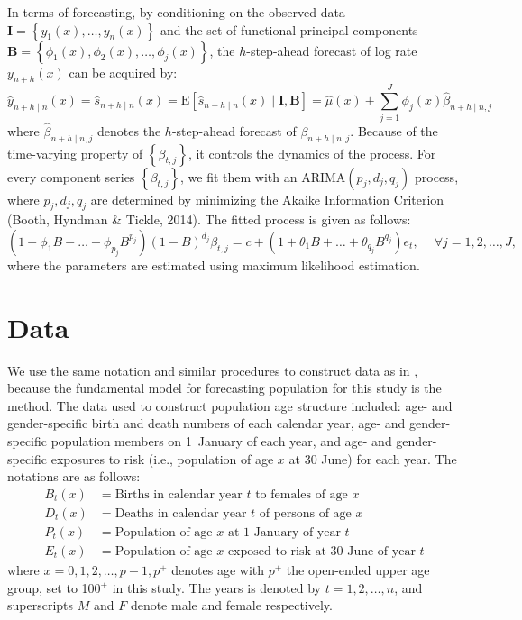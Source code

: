 \documentclass[11pt,a4paper,]{article}
\begin{document}
In terms of forecasting, by conditioning on the observed data \(\bm{I}=\left\{{y_1(x),\dots,y_n(x)}\right\}\) and the set of functional principal components \(\bm{B}=\left\{{\phi_1(x),\phi_2(x),\dots,\phi_j(x)}\right\}\), the \(h\)-step-ahead forecast of log rate \(y_{n+h}(x)\) can be acquired by:
\begin{equation}
  \widehat{y}_{n+h\mid n}(x)=\widehat{s}_{n+h\mid n}(x) = \text{E}[\widehat{s}_{n+h\mid n}(x)\mid \bm{I, B}] = \widehat{\mu}(x)+\sum_{j=1}^{J}\phi_j(x)\widehat{\beta}_{n+h\mid n,j}
\end{equation}
where \(\widehat{\beta}_{n+h\mid n,j}\) denotes the \(h\)-step-ahead forecast of \(\beta_{n+h\mid n,j}\). Because of the time-varying property of \(\left\{\beta_{t,j}\right\}\), it controls the dynamics of the process. For every component series \(\left\{\beta_{t,j}\right\}\), we fit them with an ARIMA\((p_j,d_j,q_j)\) process, where \(p_j,d_j,q_j\) are determined by minimizing the Akaike Information Criterion (Booth, Hyndman \& Tickle, 2014). The fitted process is given as follows:
\[
  (1-\phi_1B-\dots-\phi_{p_j}B^{p_j})(1-B)^{d_j}\beta_{t,j}=c+(1+\theta_1B+\dots+\theta_{q_j}B^{q_j})e_t, \quad ~\forall j=1,2,\dots,J,
\]
where the parameters are estimated using maximum likelihood estimation.

\hypertarget{sec:data}{%
\section{Data}\label{sec:data}}

We use the same notation and similar procedures to construct data as in \textcite{HB08}, because the fundamental model for forecasting population for this study is the \textcite{HU07} method. The data used to construct population age structure included: age- and gender-specific birth and death numbers of each calendar year, age- and gender-specific population members on 1~January of each year, and age- and gender-specific exposures to risk (i.e., population of age \(x\) at 30 June) for each year. The notations are as follows:
\begin{align*}
  B_t(x) &= \text{Births in calendar year $t$ to females of age $x$}\\
  D_t(x) &= \text{Deaths in calendar year $t$ of persons of age $x$}\\
  P_t(x) &= \text{Population of age $x$ at 1 January of year $t$}\\
  E_t(x) &= \text{Population of age $x$ exposed to risk at 30 June of year $t$}
\end{align*}
where \(x=0,1,2,\dots,p-1,p^+\) denotes age with \(p^+\) the open-ended upper age group, set to 100\(^+\) in this study. The years is denoted by \(t=1,2,\dots,n\), and superscripts \(M\) and \(F\) denote male and female respectively.
\end{document}
